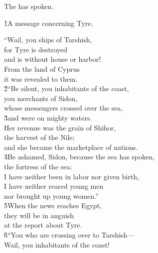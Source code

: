 The  has spoken.

\v{1}A message concerning Tyre.

\begin{poetry}
\poeml ``Wail, you ships of Tarshish, \\
\poeml for Tyre is destroyed \\
\poemlll       and is without house or harbor! \\
\poeml From the land of Cyprus \\
\poeml it was revealed to them. \\
\poeml \v{2}``Be silent, you inhabitants of the coast, \\
\poemll    you merchants of Sidon, \\
\poemlll       whose messengers crossed over the sea, \\
\poeml \v{3}and were on mighty waters. \\
\poemll    Her revenue was the grain of Shihor, \\
\poeml the harvest of the Nile; \\
\poemll    and she became the marketplace of nations. \\
\poeml \v{4}Be ashamed, Sidon, because the sea has spoken, \\
\poemll    the fortress of the sea: \\
\poeml I have neither been in labor nor given birth, \\
\poemll    I have neither reared young men \\
\poemlll       nor brought up young women.'' \\
\poeml \v{5}When the news reaches Egypt, \\
\poemll    they will be in anguish \\
\poemlll       at the report about Tyre. \\
\poeml \v{6}``You who are crossing over to Tarshish--- \\
\poemll    Wail, you inhabitants of the coast! \\

\end{poetry}
